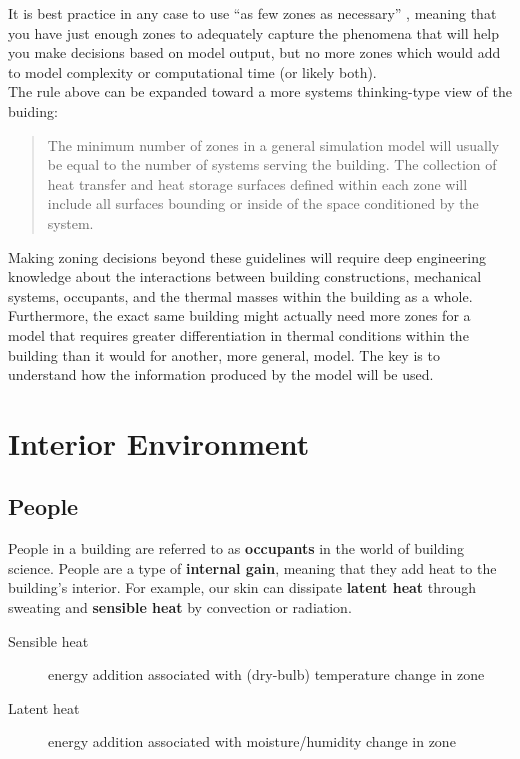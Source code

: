 \documentclass[10pt]{article}
\begin{document}
It is best practice in any case to use ``as few zones as necessary'' \cite{EPcourseteaching}, meaning that you have just enough zones to adequately capture the phenomena that will help you make decisions based on model output, but no more zones which would add to model complexity or computational time (or likely both).\\

The rule above can be expanded toward a more systems thinking-type view of the buiding:

\begin{quote}
    The minimum number of zones in a general simulation model will
usually be equal to the number of systems serving the building. The collection of heat transfer and
heat storage surfaces defined within each zone will include all surfaces bounding or inside of the
space conditioned by the system.
\end{quote}

Making zoning decisions beyond these guidelines will require deep engineering knowledge about the interactions between building constructions, mechanical systems, occupants, and the thermal masses within the building as a whole. Furthermore, the exact same building might actually need more zones for a model that requires greater differentiation in thermal conditions within the building than it would for another, more general, model. The key is to understand how the information produced by the model will be used.

\section{Interior Environment}

\subsection{People}

People in a building are referred to as \textbf{occupants} in the world of building science. People are a type of \textbf{internal gain}, meaning that they add heat to the building's interior. For example, our skin can dissipate \textbf{latent heat} through sweating and \textbf{sensible heat} by convection or radiation.

\begin{description}
\item[Sensible heat] energy addition associated with (dry-bulb) temperature change in zone \cite{EPcourseteaching}
\item[Latent heat] energy addition associated with moisture/humidity change in zone \cite{EPcourseteaching} 
\end{description}
\end{document}

